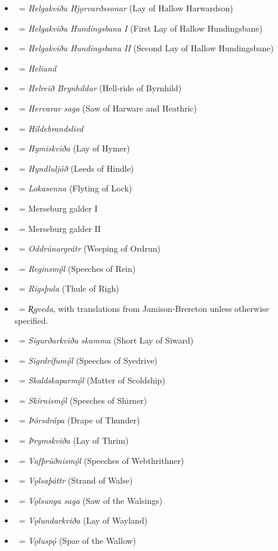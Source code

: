 \begin{itemize}
	\item \HelgakvidaHjorvardssonar\ = \emph{Helgakviða Hjǫrvarðssonar} (Lay of Hallow Harwardson)
	\item \HelgakvidaOne\ = \emph{Helgakviða Hundingsbana I} (First Lay of Hallow Hundingsbane)
	\item \HelgakvidaTwo\ = \emph{Helgakviða Hundingsbana II} (Second Lay of Hallow Hundingsbane)
	\item \Heliand\ = \emph{Heliand}
	\item \Helreid\ = \emph{Helreið Brynhildar} (Hell‑ride of Byrnhild)
	\item \HervararSaga\ = \emph{Hervarar saga} (Saw of Harware and Heathric)
	\item \Hildebrandslied\ = \emph{Hildebrandslied}
	\item \Hymiskvida\ = \emph{Hymiskviða} (Lay of Hymer)
	\item \Hyndluljod\ = \emph{Hyndluljóð} (Leeds of Hindle)
	\item \Lokasenna\ = \emph{Lokasenna} (Flyting of Lock)
	\item \MerseburgOne\ = Merseburg galder I
	\item \MerseburgTwo\ = Merseburg galder II
	\item \Oddrunargratr\ = \emph{Oddrúnargrátr} (Weeping of Ordrun)
	\item \Reginsmal\ = \emph{Reginsmǫ́l} (Speeches of Rein)
	\item \Rigsthula\ = \emph{Rigsþula} (Thule of Righ)
	\item \Rigveda\ = \emph{R̥gveda}, with translations from Jamison‑Brereton unless otherwise specified.
	\item \Sigurdskamma\ = \emph{Sigurðarkviða skamma} (Short Lay of Siward)
	\item \Sigrdrifumal\ = \emph{Sigrdrífumǫ́l} (Speeches of Syedrive)
	\item \Skaldskaparmal\ = \emph{Skaldskaparmǫ́l} (Matter of Scoldship)
	\item \Skirnismal\ = \emph{Skírnismǫ́l} (Speeches of Shirner)
	\item \Thorsdrapa\ = \emph{Þórsdrápa} (Drape of Thunder)
	\item \Thrymskvida\ = \emph{Þrymskviða} (Lay of Thrim)
	\item \Vafthrudnismal\ = \emph{Vafþrúðnismǫ́l} (Speeches of Webthrithner)
	\item \Volsathattr\ = \emph{Vǫlsaþáttr} (Strand of Walse)
	\item \VolsungaSaga\ = \emph{Vǫlsunga saga} (Saw of the Walsings)
	\item \Volundarkvida\ = \emph{Vǫlundarkviða} (Lay of Wayland)
	\item \Voluspa\ = \emph{Vǫluspǫ́} (Spae of the Wallow)
\end{itemize}%


